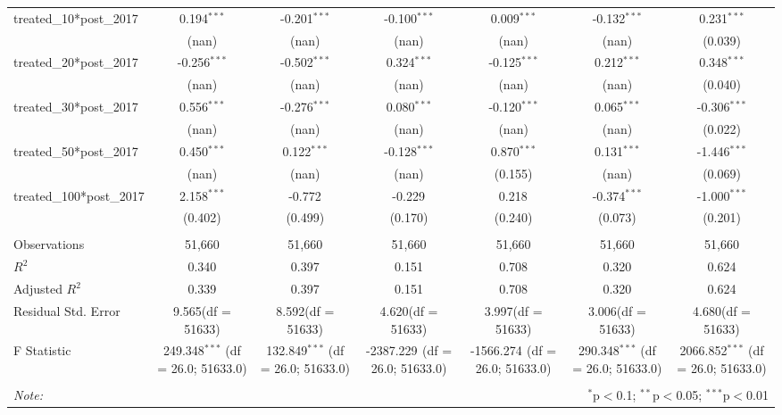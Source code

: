 \begin{table}[!htbp]
\begin{tabular}{@{\extracolsep{5pt}}lcccccc}
 treated_10*post_2017 & 0.194$^{***}$ & -0.201$^{***}$ & -0.100$^{***}$ & 0.009$^{***}$ & -0.132$^{***}$ & 0.231$^{***}$ \\
  & (nan) & (nan) & (nan) & (nan) & (nan) & (0.039) \\
 treated_20*post_2017 & -0.256$^{***}$ & -0.502$^{***}$ & 0.324$^{***}$ & -0.125$^{***}$ & 0.212$^{***}$ & 0.348$^{***}$ \\
  & (nan) & (nan) & (nan) & (nan) & (nan) & (0.040) \\
 treated_30*post_2017 & 0.556$^{***}$ & -0.276$^{***}$ & 0.080$^{***}$ & -0.120$^{***}$ & 0.065$^{***}$ & -0.306$^{***}$ \\
  & (nan) & (nan) & (nan) & (nan) & (nan) & (0.022) \\
 treated_50*post_2017 & 0.450$^{***}$ & 0.122$^{***}$ & -0.128$^{***}$ & 0.870$^{***}$ & 0.131$^{***}$ & -1.446$^{***}$ \\
  & (nan) & (nan) & (nan) & (0.155) & (nan) & (0.069) \\
 treated_100*post_2017 & 2.158$^{***}$ & -0.772$^{}$ & -0.229$^{}$ & 0.218$^{}$ & -0.374$^{***}$ & -1.000$^{***}$ \\
  & (0.402) & (0.499) & (0.170) & (0.240) & (0.073) & (0.201) \\
\hline \\[-1.8ex]
 Observations & 51,660 & 51,660 & 51,660 & 51,660 & 51,660 & 51,660 \\
 $R^2$ & 0.340 & 0.397 & 0.151 & 0.708 & 0.320 & 0.624 \\
 Adjusted $R^2$ & 0.339 & 0.397 & 0.151 & 0.708 & 0.320 & 0.624 \\
 Residual Std. Error & 9.565(df = 51633) & 8.592(df = 51633) & 4.620(df = 51633) & 3.997(df = 51633) & 3.006(df = 51633) & 4.680(df = 51633)  \\
 F Statistic & 249.348$^{***}$ (df = 26.0; 51633.0) & 132.849$^{***}$ (df = 26.0; 51633.0) & -2387.229$^{}$ (df = 26.0; 51633.0) & -1566.274$^{}$ (df = 26.0; 51633.0) & 290.348$^{***}$ (df = 26.0; 51633.0) & 2066.852$^{***}$ (df = 26.0; 51633.0) \\
\hline
\hline \\[-1.8ex]
\textit{Note:} & \multicolumn{6}{r}{$^{*}$p$<$0.1; $^{**}$p$<$0.05; $^{***}$p$<$0.01} \\
\end{tabular}
\end{table}